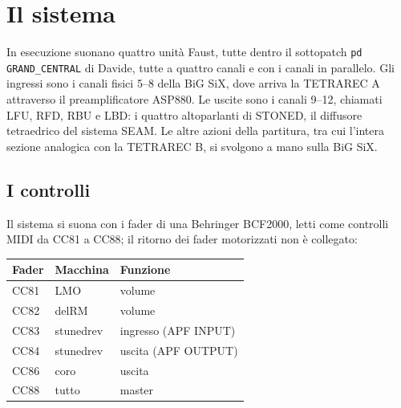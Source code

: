 \chapter{Il sistema}\label{cap:sistema}
In esecuzione suonano quattro unità Faust, tutte dentro il sottopatch \texttt{pd GRAND\_CENTRAL} di Davide, tutte a quattro canali e con i canali in parallelo.
Gli ingressi sono i canali fisici 5--8 della BiG SiX, dove arriva la TETRAREC A attraverso il preamplificatore ASP880.
Le uscite sono i canali 9--12, chiamati LFU, RFD, RBU e LBD: i quattro altoparlanti di STONED, il diffusore tetraedrico del sistema SEAM.
Le altre azioni della partitura, tra cui l'intera sezione analogica con la TETRAREC B, si svolgono a mano sulla BiG SiX.

\begin{center}
\end{center}

\section{I controlli}
Il sistema si suona con i fader di una Behringer BCF2000, letti come controlli MIDI da CC81 a CC88; il ritorno dei fader motorizzati non è collegato:

\begin{center}
\begin{tabular}{@{}lll@{}}
\toprule
Fader & Macchina & Funzione\\
\midrule
CC81 & LMO & volume\\
CC82 & delRM & volume\\
CC83 & stunedrev & ingresso (APF INPUT)\\
CC84 & stunedrev & uscita (APF OUTPUT)\\
CC86 & coro & uscita\\
CC88 & tutto & master\\
\bottomrule
\end{tabular}
\end{center}

